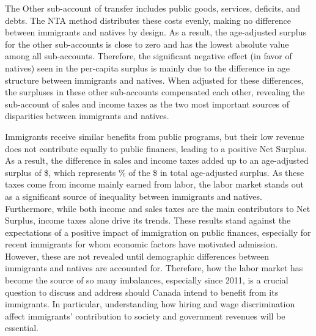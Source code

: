 \vspace{0.7em}\par
The Other sub-account of transfer includes public goods, services, deficits, and debts.
The NTA method distributes these costs evenly, making no difference between immigrants and natives by design.
As a result, the age-adjusted surplus for the other sub-accounts is close to zero and has the lowest absolute value among all sub-accounts.
Therefore, the significant negative effect (in favor of natives) seen in the per-capita surplus is mainly due to the difference in age structure between immigrants and natives.
When adjusted for these differences, the surpluses in these other sub-accounts compensated each other, revealing the sub-account of sales and income taxes as the two most important sources of disparities between immigrants and natives.

\vspace{0.7em}\par
Immigrants receive similar benefits from public programs, but their low revenue does not contribute equally to public finances, leading to a positive Net Surplus.
As a result, the difference in sales and income taxes added up to an age-adjusted surplus of \$, which represents \% of the \$ in total age-adjusted surplus.
As these taxes come from income mainly earned from labor, the labor market stands out as a significant source of inequality between immigrants and natives.
Furthermore, while both income and sales taxes are the main contributors to Net Surplus, income taxes alone drive its trends.
These results stand against the expectations of a positive impact of immigration on public finances, especially for recent immigrants for whom economic factors have motivated admission.
However, these are not revealed until demographic differences between immigrants and natives are accounted for.
Therefore, how the labor market has become the source of so many imbalances, especially since 2011, is a crucial question to discuss and address should Canada intend to benefit from its immigrants.
In particular, understanding how hiring and wage discrimination affect immigrants' contribution to society and government revenues will be essential.

















